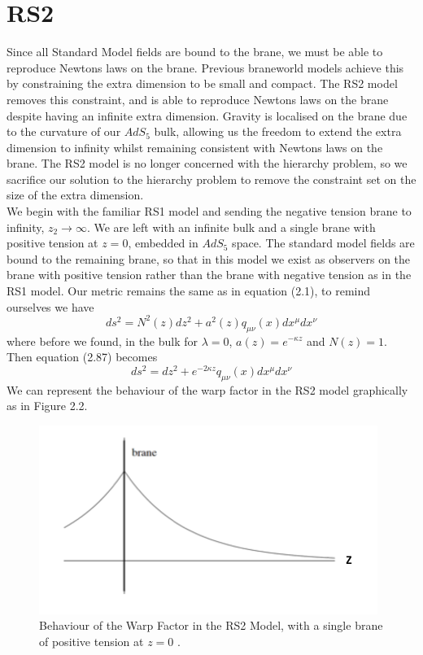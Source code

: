 \documentclass[11pt]{report}
\numberwithin{equation}{chapter}
\begin{document}
\section{RS2}
Since all Standard Model fields are bound to the brane, we must be able to reproduce Newtons laws on the brane. Previous braneworld models achieve this by constraining the extra dimension to be small and compact. The RS2 model removes this constraint, and is able to reproduce Newtons laws on the brane despite having an infinite extra dimension. Gravity is localised on the brane due to the curvature of our $AdS_5$ bulk, allowing us the freedom to extend the extra dimension to infinity whilst remaining consistent with Newtons laws on the brane. The RS2 model is no longer concerned with the hierarchy problem, so we sacrifice our solution to the hierarchy problem to remove the constraint set on the size of the extra dimension.\\
We begin with the familiar RS1 model and sending the negative tension brane to infinity, $z_2 \longrightarrow \infty$. We are left with an infinite bulk and a single brane with positive tension at $z = 0$, embedded in $AdS_5$ space. The standard model fields are bound to the remaining brane, so that in this model we exist as observers on the brane with positive tension rather than the brane with negative tension as in the RS1 model.
Our metric remains the same as in equation (2.1), to remind ourselves we have
\begin{equation}
    ds^2= N^2(z)dz^{2} + a^{2}(z) q _{\mu\nu}(x) dx^{\mu} dx^{\nu}
\end{equation}
where before we found, in the bulk for $\lambda = 0$, $a(z) = e^{-\kappa z}$ and $N(z)=1$. Then equation (2.87) becomes
\begin{equation}
    ds^2= dz^{2} + e^{-2\kappa z}q _{\mu\nu}(x) dx^{\mu} dx^{\nu}
\end{equation}
We can represent the behaviour of the warp factor in the RS2 model graphically as in Figure 2.2. 
\begin{figure}[H]
\centering
    \includegraphics[scale=0.8]{Images/RS2 model.png}
    \caption{Behaviour of the Warp Factor in the RS2 Model, with a single brane of positive tension at $z=0$ \cite{Figures}.}
    \label{fig:RS2}
\end{figure}
\end{document}

